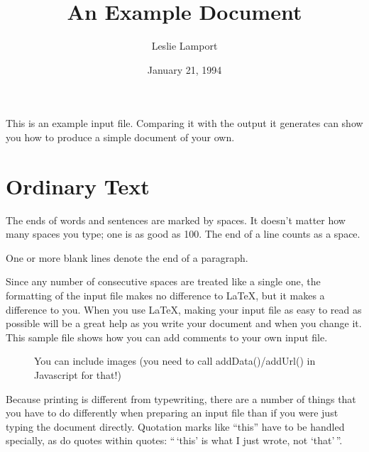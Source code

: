 \documentclass{article} %
\title{An Example Document} %
\author{Leslie Lamport} %
\date{January 21, 1994} %
\begin{document}

\maketitle %

This is an example input file. Comparing it with
the output it generates can show you how to
produce a simple document of your own.

\section{Ordinary Text} %

The ends of words and sentences are marked
  by spaces. It doesn't matter how many
spaces you type; one is as good as 100. The
end of a line counts as a space.

One or more blank lines denote the end
of a paragraph.

Since any number of consecutive spaces are treated
like a single one, the formatting of the input
file makes no difference to
      \LaTeX, %
but it makes a difference to you. When you use
\LaTeX, making your input file as easy to read
as possible will be a great help as you write
your document and when you change it. This sample
file shows how you can add comments to your own input
file.

\begin{figure}[h]
\caption{You can include images (you need to call addData()/addUrl() in Javascript for that!)}
\end{figure}

Because printing is different from typewriting,
there are a number of things that you have to do
differently when preparing an input file than if
you were just typing the document directly.
Quotation marks like
       ``this''
have to be handled specially, as do quotes within
quotes:
       ``\,`this' %
        is what I just
        wrote, not `that'\,''.
\end{document}

